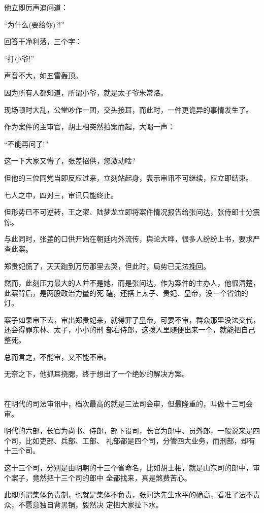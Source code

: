 \documentclass[11pt,a4paper,onecolumn]{article}
\begin{document}
他立即厉声追问道：

``为什么(要给你)?!''

回答干净利落，三个字：

``打小爷!''

声音不大，如五雷轰顶。

因为所有人都知道，所谓小爷，就是太子爷朱常洛。

现场顿时大乱，公堂吵作一团，交头接耳，而此时，一件更诡异的事情发生了。

作为案件的主审官，胡士相突然拍案而起，大喝一声：

``不能再问了!''

这一下大家又懵了，张差招供，您激动啥?

但他的三位同党当即反应过来，立刻站起身，表示审讯不可继续，应立即结束。

七人之中，四对三，审讯只能终止。

但形势已不可逆转，王之寀、陆梦龙立即将案件情况报告给张问达，张侍郎十分震惊。

与此同时，张差的口供开始在朝廷内外流传，舆论大哗，很多人纷纷上书，要求严查此案。

郑贵妃慌了，天天跑到万历那里去哭，但此时，局势已无法挽回。

然而，此刻压力最大的人并不是她，而是张问达，作为案件的主办人，他很清楚，此案背后，是两股政治力量的死
磕，还搭上太子、贵妃、皇帝，没一个省油的灯。

案子如果审下去，审出郑贵妃来，就得罪了皇帝，可要不审，群众那里没法交代，还会得罪东林、太子，小小的刑
部右侍郎，这拨人里随便出来一个，就能把自己整死。

总而言之，不能审，又不能不审。

无奈之下，他抓耳挠腮，终于想出了一个绝妙的解决方案。

\section[\thesection]{}

在明代的司法审讯中，档次最高的就是三法司会审，但最隆重的，叫做十三司会审。

明代的六部，长官为尚书、侍郎，部下设司，长官为郎中、员外郎，一般说来是四个司，比如吏部、兵部、工部、
礼部都是四个司，分管四大业务，而刑部，却有十三个司。

这十三个司，分别是由明朝的十三个省命名，比如胡士相，就是山东司的郎中，审个案子，竟然把十三个司的郎中
全都找来，真是煞费苦心。

此即所谓集体负责制，也就是集体不负责，张问达先生水平的确高，看准了法不责众，不愿意独自背黑锅，毅然决
定把大家拉下水。
\end{document}
